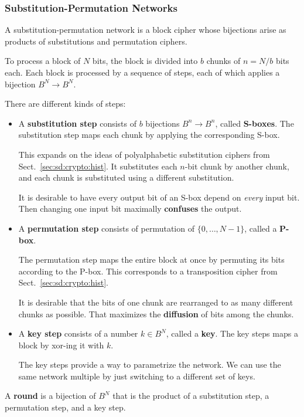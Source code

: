 \subsubsection{Substitution-Permutation Networks}

A substitution-permutation network is a block cipher whose bijections arise as products of substitutions and permutation ciphers.

To process a block of $N$ bits, the block is divided into $b$ chunks of $n=N/b$ bits each.
Each block is processed by a sequence of steps, each of which applies a bijection $B^N\to B^N$.

There are different kinds of steps:
\begin{itemize}
\item A \textbf{substitution step} consists of $b$ bijections $B^n\to B^n$, called \textbf{S-boxes}.
The substitution step maps each chunk by applying the corresponding S-box.

This expands on the ideas of polyalphabetic substitution ciphers from Sect.~\ref{sec:sd:crypto:hist}.
It substitutes each $n$-bit chunk by another chunk, and each chunk is substituted using a different substitution.

It is desirable to have every output bit of an S-box depend on \emph{every} input bit.
Then changing one input bit maximally \textbf{confuses} the output.

\item A \textbf{permutation step} consists of permutation of $\{0,\ldots,N-1\}$, called a \textbf{P-box}.

The permutation step maps the entire block at once by permuting its bits according to the P-box.
This corresponds to a transposition cipher from Sect.~\ref{sec:sd:crypto:hist}.

It is desirable that the bits of one chunk are rearranged to as many different chunks as possible.
That maximizes the \textbf{diffusion} of bits among the chunks.

\item A \textbf{key step} consists of a number $k\in B^N$, called a \textbf{key}.
The key steps maps a block by xor-ing it with $k$.

The key steps provide a way to parametrize the network.
We can use the same network multiple by just switching to a different set of keys.
\end{itemize}

A \textbf{round} is a bijection of $B^N$ that is the product of a substitution step, a permutation step, and a key step.

